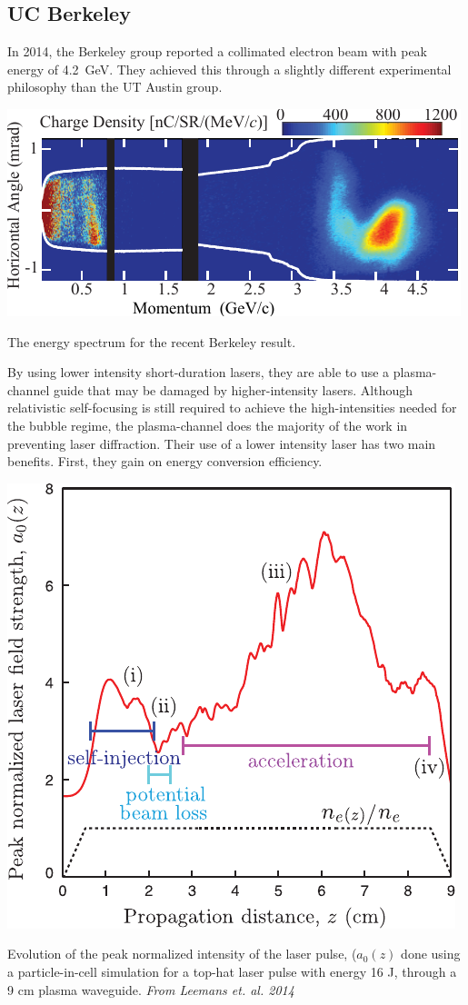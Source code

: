 \documentclass[12pt,letter]{article}
\begin{document}
\subsection{UC Berkeley}
In 2014, the Berkeley group reported a collimated electron beam with peak
energy of \SI{4.2}{\giga \electronvolt}. They achieved this through a slightly
different experimental philosophy than the UT Austin group.
\begin{marginfigure}[-100pt]
    \includegraphics[width=\marginparwidth]{../figures/esaenergy.pdf}
    \caption{The energy spectrum for the recent Berkeley result.}
\end{marginfigure}
By using lower intensity
short-duration lasers, they are able to use a plasma-channel guide that may be
damaged by higher-intensity lasers. Although
relativistic self-focusing is still required to achieve the high-intensities
needed for the bubble regime, the plasma-channel does the majority of the work
in preventing laser diffraction. Their use of a lower intensity laser has two
main benefits. First, they gain on energy conversion efficiency.
\begin{marginfigure}
	\includegraphics[width=\marginparwidth]{../figures/esareycapfield.pdf}
    \caption{Evolution of the peak normalized intensity of the laser pulse,
    ($a_0(z)$ done using a particle-in-cell simulation for a top-hat laser pulse
    with energy 16 J, through a 9 \si{cm} plasma waveguide. {\em From Leemans
et. al. 2014 \cite{PhysRevLett.113.245002}}\label{fig:esasim}}
\end{marginfigure}
\end{document}
